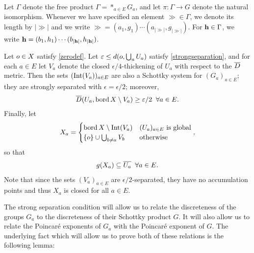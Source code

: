 \begin{notation}
\label{notationVa}
Let $\Gamma$ denote the free product $\Gamma = \ast_{a\in E} G_a$, and let $\pi:\Gamma\to G$ denote the natural isomorphism. Whenever we have specified an element $\gg\in\Gamma$, we denote its length by $|\gg|$ and we write $\gg = (a_1,g_1)\cdots(a_{|\gg|},g_{|\gg|})$. For $\mathbf h\in\Gamma$, we write $\mathbf h = (b_1,h_1)\cdots(b_{|\mathbf h|},h_{|\mathbf h|})$.

Let $o\in X$ satisfy \eqref{zerodef}. Let $\varepsilon\leq d(o,\bigcup_a U_a)$ satisfy \eqref{strongseparation}, and for each $a\in E$ let $V_a$ denote the closed $\epsilon/4$-thickening of $U_a$ with respect to the $\overline{D}$ metric. Then the sets $(\operatorname{Int}(V_a))_{a\in E}$ are also a Schottky system for $(G_a)_{a\in E}$; they are strongly separated with $\epsilon = \epsilon/2$; moreover,
\begin{equation}
\label{UaVa}
\overline{D}(U_a,\operatorname{bord} X\setminus V_a) \geq \varepsilon/2 \;\;\forall a\in E.
\end{equation}
Finally, let
\[
X_a = \begin{cases}
\operatorname{bord} X \setminus \operatorname{Int}(V_a) & \textup{$(U_a)_{a\in E}$ is global}\\
\{o\}\cup\bigcup_{b\neq a} V_b & \textup{otherwise}
\end{cases},
\]
so that
\begin{equation}
\label{XaUa}
g(X_a) \subseteq \overline{U_a} \;\;\forall a\in E.
\end{equation}
Note that since the sets $(V_a)_{a\in E}$ are $\epsilon/2$-separated, they have no accumulation points and thus $X_a$ is closed for all $a\in E$.
\end{notation}

The strong separation condition will allow us to relate the discreteness of the groups $G_a$ to the discreteness of their Schottky product $G$. It will also allow us to relate the Poincar\'e exponents of $G_a$ with the Poincar\'e exponent of $G$. The underlying fact which will allow us to prove both of these relations is the following lemma:

